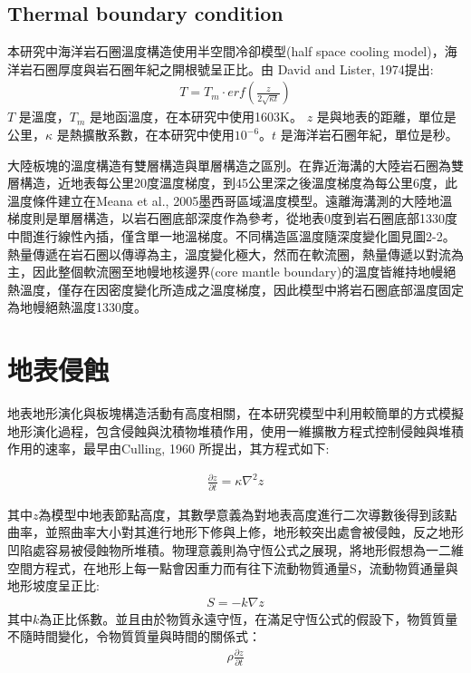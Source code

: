 \subsection{Thermal boundary condition}
本研究中海洋岩石圈溫度構造使用半空間冷卻模型(half space cooling model)，海洋岩石圈厚度與岩石圈年紀之開根號呈正比。由 David and Lister, 1974提出:
\begin{align}
T=T_m\cdot {erf}(\frac{z}{2\sqrt{\kappa t}})
\end{align}
$T$ 是溫度，$T_m$ 是地函溫度，在本研究中使用1603K。
$z$ 是與地表的距離，單位是公里，$\kappa$ 是熱擴散系數，在本研究中使用$10^{-6}$。$t$ 是海洋岩石圈年紀，單位是秒。

大陸板塊的溫度構造有雙層構造與單層構造之區別。在靠近海溝的大陸岩石圈為雙層構造，近地表每公里20度溫度梯度，到45公里深之後溫度梯度為每公里6度，此溫度條件建立在Meana et al., 2005墨西哥區域溫度模型。遠離海溝測的大陸地溫梯度則是單層構造，以岩石圈底部深度作為參考，從地表0度到岩石圈底部1330度中間進行線性內插，僅含單一地溫梯度。不同構造區溫度隨深度變化圖見圖2-2。熱量傳遞在岩石圈以傳導為主，溫度變化極大，然而在軟流圈，熱量傳遞以對流為主，因此整個軟流圈至地幔地核邊界(core mantle boundary)的溫度皆維持地幔絕熱溫度，僅存在因密度變化所造成之溫度梯度，因此模型中將岩石圈底部溫度固定為地幔絕熱溫度1330度。

\section{地表侵蝕}
地表地形演化與板塊構造活動有高度相關，在本研究模型中利用較簡單的方式模擬地形演化過程，包含侵蝕與沈積物堆積作用，使用一維擴散方程式控制侵蝕與堆積作用的速率，最早由Culling, 1960 所提出，其方程式如下:

\begin{align}
\frac{\partial z}{\partial t} = \kappa \nabla^2 z \label{eq: erosion}
\end{align}

其中$z$為模型中地表節點高度，其數學意義為對地表高度進行二次導數後得到該點曲率，並照曲率大小對其進行地形下修與上修，地形較突出處會被侵蝕，反之地形凹陷處容易被侵蝕物所堆積。物理意義則為守恆公式之展現，將地形假想為一二維空間方程式，在地形上每一點會因重力而有往下流動物質通量S，流動物質通量與地形坡度呈正比:
\begin{align}
S = -k\nabla z \label{eq: S}
\end{align}
其中$k$為正比係數。並且由於物質永遠守恆，在滿足守恆公式的假設下，物質質量不隨時間變化，令物質質量與時間的關係式：
\begin{align}
\rho\frac{\partial z}{\partial t}\label{eq:rho}
\end{align}

